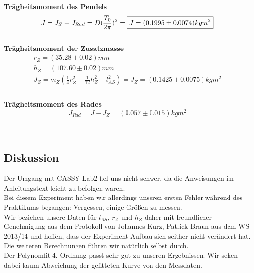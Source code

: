 \documentclass{article}
\begin{document}
\\
\textbf{Trägheitsmoment des Pendels}\\
\begin{equation*}
J = J_Z + J_{Rad} = D (\frac{T_0}{2\pi})^2=\boxed{J=(0.1995 \pm 0.0074) kg m^2}\\
\end{equation*}
\\
\textbf{Trägheitsmoment der Zusatzmasse}\\
\begin{gather*}
r_Z=(35.28 \pm 0.02)mm\\
h_Z=(107.60 \pm 0.02)mm\\
J_Z = m_Z(\frac{1}{4}r^2_Z + \frac{1}{12}h^2_Z+l^2_{AS})=\boxed{J_Z=(0.1425 \pm 0.0075)kg m^2}\\
\end{gather*}
\\
\textbf{Trägheitsmoment des Rades}\\
$$\boxed{J_{Rad} = J - J_Z = (0.057 \pm 0.015)kg m^2}$$\\
\\
\subsection{Diskussion}
Der Umgang mit CASSY-Lab2 fiel uns nicht schwer, da die Anweisungen im Anleitungstext leicht zu befolgen waren.\\
Bei diesem Experiment haben wir allerdings unseren ersten Fehler während des Praktikums begangen: Vergessen, einige Größen zu messen. \\
Wir beziehen unsere Daten für $l_{AS}$, $r_Z$ und $h_Z$ daher mit freundlicher Genehmigung aus dem Protokoll von Johannes Kurz, Patrick Braun aus dem WS 2013/14 und hoffen, dass der Experiment-Aufbau sich seither nicht verändert hat. Die weiteren Berechnungen führen wir natürlich selbst durch. \\
Der Polynomfit 4. Ordnung passt sehr gut zu unseren Ergebnissen. Wir sehen dabei kaum Abweichung der gefitteten Kurve von den Messdaten.\\
\end{document}
